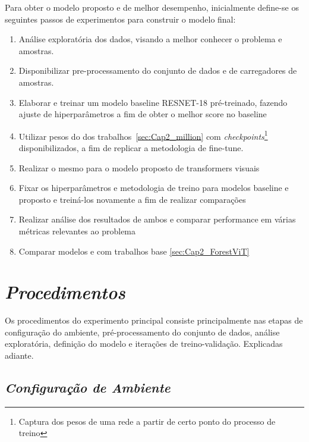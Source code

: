 Para obter o modelo proposto e de melhor desempenho, inicialmente define-se os seguintes passos de experimentos para construir o modelo final:

\begin{enumerate}
\item   Análise exploratória dos dados, visando a melhor conhecer o problema e amostras. 
\item   Disponibilizar pre-processamento do conjunto de dados e de carregadores de amostras.
\item   Elaborar e treinar um modelo baseline RESNET-18 pré-treinado, fazendo ajuste de hiperparâmetros a fim de obter o melhor score no baseline
\item   Utilizar pesos do dos trabalhos~\ref{sec:Cap2_million} com \textit{checkpoints}\footnote{Captura dos pesos de uma rede a partir de certo ponto do processo de treino} disponibilizados, a fim de replicar a metodologia de fine-tune. 
\item   Realizar o mesmo para o modelo proposto de transformers visuais
\item   Fixar os hiperparâmetros e metodologia de treino para modelos baseline e proposto e treiná-los novamente a fim de realizar comparações
\item   Realizar análise dos resultados de ambos e comparar performance em várias métricas relevantes ao problema
\item   Comparar modelos e com trabalhos base \ref{sec:Cap2_ForestViT} 
\end{enumerate}


    

\section{\textit{Procedimentos}}\label{sec:Cap3_Procedimentos}

Os procedimentos do experimento principal consiste principalmente nas etapas de configuração do ambiente, pré-processamento do conjunto de dados, análise exploratória, definição do modelo e iterações de treino-validação. Explicadas adiante.

\subsection{\textit{Configuração de Ambiente}}\label{sec:Cap3_ConfigAmbiente}

